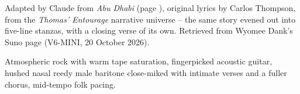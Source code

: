 
\label{sec:no-titles}
\begin{notes}
Adapted by Claude from \emph{Abu Dhabi} (page \pageref{sec:abu-dhabi}), original lyrics by Carlos Thompson, from the \emph{Thomas' Entourage} narrative universe -- the same story evened out into five-line stanzas, with a closing verse of its own. Retrieved from Wyomee Dank's Suno page (V6-MINI, 20 October 2026).
\end{notes}
\begin{style}
Atmospheric rock with warm tape saturation, fingerpicked acoustic guitar, hushed nasal reedy male baritone close-miked with intimate verses and a fuller chorus, mid-tempo folk pacing.
\end{style}
